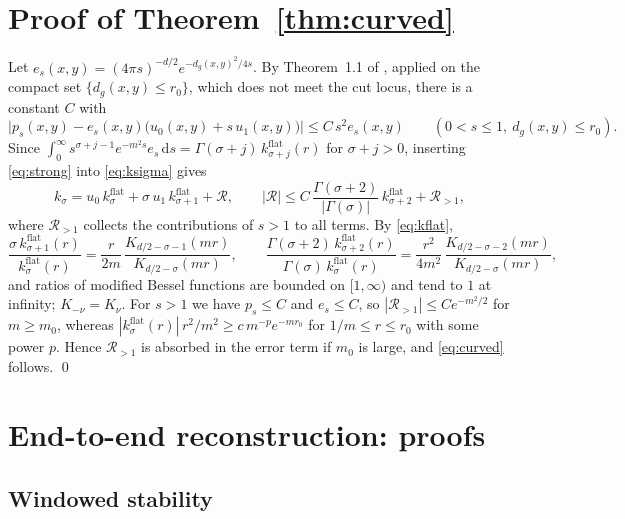 \documentclass[11pt,a4paper]{article}
\theoremstyle{stmt}
\theoremstyle{defn}
\theoremstyle{rmk}
\numberwithin{equation}{section}
\newcommand{\dd}{\mathrm{d}}
\begin{document}
\section{Proof of Theorem~\ref{thm:curved}}\label{app:curved}

Let $e_s(x,y)=(4\pi s)^{-d/2}e^{-d_g(x,y)^2/4s}$. By Theorem~1.1 of \cite{Ludewig}, applied on the compact set $\{d_g(x,y)\le r_0\}$, which does not meet the cut locus, there is a constant $C$ with
\begin{equation}\label{eq:strong}
\big|p_s(x,y)-e_s(x,y)\big(u_0(x,y)+s\,u_1(x,y)\big)\big|\le C\,s^2e_s(x,y)\qquad(0<s\le1,\ d_g(x,y)\le r_0).
\end{equation}
Since $\int_0^\infty s^{\sigma+j-1}e^{-m^2s}e_s\,\dd s=\Gamma(\sigma+j)\,k^{\mathrm{flat}}_{\sigma+j}(r)$ for $\sigma+j>0$, inserting \eqref{eq:strong} into \eqref{eq:ksigma} gives
\[
k_\sigma=u_0\,k^{\mathrm{flat}}_\sigma+\sigma\,u_1\,k^{\mathrm{flat}}_{\sigma+1}+\mathcal R,\qquad|\mathcal R|\le C\,\frac{\Gamma(\sigma+2)}{|\Gamma(\sigma)|}\,k^{\mathrm{flat}}_{\sigma+2}+\mathcal R_{>1},
\]
where $\mathcal R_{>1}$ collects the contributions of $s>1$ to all terms. By \eqref{eq:kflat},
\[
\frac{\sigma\,k^{\mathrm{flat}}_{\sigma+1}(r)}{k^{\mathrm{flat}}_\sigma(r)}=\frac r{2m}\,\frac{K_{d/2-\sigma-1}(mr)}{K_{d/2-\sigma}(mr)},\qquad
\frac{\Gamma(\sigma+2)\,k^{\mathrm{flat}}_{\sigma+2}(r)}{\Gamma(\sigma)\,k^{\mathrm{flat}}_\sigma(r)}=\frac{r^2}{4m^2}\,\frac{K_{d/2-\sigma-2}(mr)}{K_{d/2-\sigma}(mr)},
\]
and ratios of modified Bessel functions are bounded on $[1,\infty)$ and tend to $1$ at infinity; $K_{-\nu}=K_\nu$. For $s>1$ we have $p_s\le C$ and $e_s\le C$, so $|\mathcal R_{>1}|\le Ce^{-m^2/2}$ for $m\ge m_0$, whereas $|k^{\mathrm{flat}}_\sigma(r)|\,r^2/m^2\ge c\,m^{-p}e^{-mr_0}$ for $1/m\le r\le r_0$ with some power $p$. Hence $\mathcal R_{>1}$ is absorbed in the error term if $m_0$ is large, and \eqref{eq:curved} follows. \qed


\section{End-to-end reconstruction: proofs}\label{app:e2e}

\subsection{Windowed stability}
\end{document}
